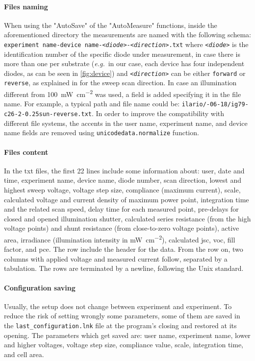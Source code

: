 		\paragraph{Files naming}\label{pypv_naming_files}
		When using the "AutoSave" of the "AutoMeasure" functions, inside the aforementioned directory the measurements are named with the following schema: \texttt{experiment name-device name-\textit{<diode>}-\textit{<direction>}.txt} where \textit{\texttt{<diode>}} is the identification number of the specific diode under measurement, in case there is more than one per substrate (\textsl{e.g.}\ in our case, each device has four independent diodes, as can be seen in \cref{fig:device}) and \texttt{\textit{<direction>}} can be either \texttt{forward} or \texttt{reverse}, as explained in  for the sweep scan direction.
		In case an illumination different from \SI{100}{\mW\per\square\cm} was used, a field is added specifying it in the file name.
		For example, a typical path and file name could be: \texttt{ilario/-06-18/\-ig79-c26-2-0.25sun-reverse.txt}.
		In order to improve the compatibility with different file systems, the accents in the user name, experiment name, and device name fields are removed using \texttt{unicode\-data.\-normalize} function.

		\paragraph{Files content}
		In the txt files, the first 22 lines include some information about: user, date and time, experiment name, device name, diode number, scan direction, lowest and highest sweep voltage, voltage step size, compliance (maximum current), scale, calculated voltage and current density of maximum power point, integration time and the related scan speed, delay time for each measured point, pre-delays for closed and opened illumination shutter, calculated series resistance (from the high voltage points) and shunt resistance (from close\hyp{}to\hyp{}zero voltage points), active area, irradiance (illumination intensity in \si{\mW\per\square\cm}), calculated \gls{jsc}, \gls{voc}, fill factor, and \gls{pce}.
		The  row include the header for the data.
		From the  row on, two columns with applied voltage and measured current follow, separated by a tabulation.
		The rows are terminated by a \texttt{\n} newline, following the Unix standard.

		\paragraph{Configuration saving}
		Usually, the setup does not change between experiment and experiment.
		To reduce the risk of setting wrongly some parameters, some of them are saved in the \texttt{last\_configuration.lnk} file at the program's closing and restored at its opening.
		The parameters which get saved are: user name, experiment name, lower and higher voltages, voltage step size, compliance value, scale, integration time, and cell area.

